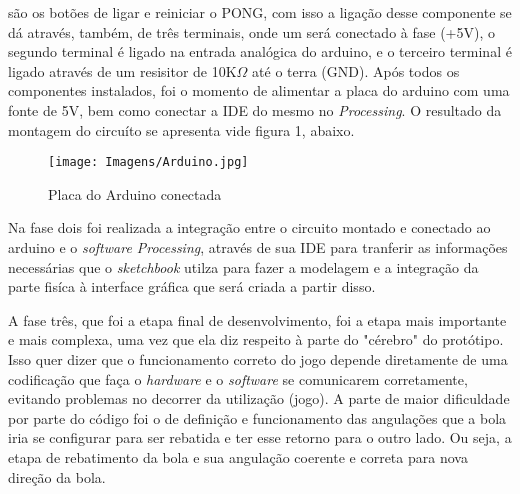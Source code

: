 \documentclass[11pt, a4paper, twocolumn]{article}
\begin{document}
    são os botões de ligar e reiniciar o PONG, com isso a ligação desse componente se dá através, também, de três terminais, onde um será conectado à fase 
    (+5V), o segundo terminal é ligado na entrada analógica do arduino, e o terceiro terminal é ligado através de um resisitor de 10K$\Omega$ até o terra (GND).
    Após todos os componentes instalados, foi o momento de alimentar a placa do arduino com uma fonte de 5V, bem como conectar a IDE do mesmo no \textit{Processing}.
    O resultado da montagem do circuíto se apresenta vide figura 1, abaixo.
        \begin{figure}[h]
            \caption{Placa do Arduino conectada}
            \centering
            \texttt{[image: Imagens/Arduino.jpg]}
        \end{figure}
    Na fase dois foi realizada a integração entre o circuito montado e conectado ao arduino e o \textit{software Processing}, através de sua IDE para tranferir as 
    informações necessárias que o \textit{sketchbook} utilza para fazer a modelagem e a integração da parte fisíca à interface gráfica que será criada a partir disso.

    
    A fase três, que foi a etapa final de desenvolvimento, foi a etapa mais importante e mais complexa, uma vez que ela diz respeito à parte do "cérebro" do protótipo.
    Isso quer dizer que o funcionamento correto do jogo depende diretamente de uma codificação que faça o \textit{hardware} e o \textit{software} se comunicarem corretamente, 
    evitando problemas no decorrer da utilização (jogo). A parte de maior dificuldade por parte do código foi o de definição e funcionamento das angulações que a bola iria 
    se configurar para ser rebatida e ter esse retorno para o outro lado. Ou seja, a etapa de rebatimento da bola e sua angulação coerente e correta para nova direção da bola. 

    
    
\end{document}
